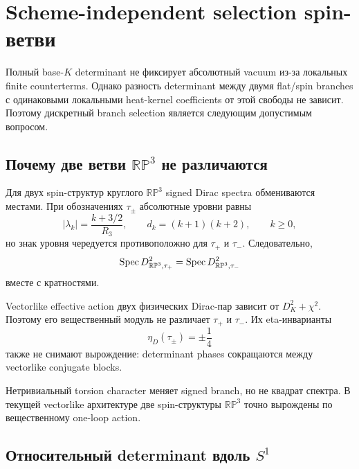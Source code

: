 \chapter{Scheme-independent selection spin-ветви}

Полный base-\(K\) determinant не фиксирует абсолютный vacuum из-за
локальных finite counterterms. Однако разность determinant между двумя
flat/spin branches с одинаковыми локальными heat-kernel coefficients от
этой свободы не зависит. Поэтому дискретный branch selection является
следующим допустимым вопросом.

\section{Почему две ветви \texorpdfstring{\(\mathbb{RP}^3\)}{RP3} не различаются}

Для двух spin-структур круглого \(\mathbb{RP}^3\) signed Dirac spectra
обмениваются местами. При обозначениях \(\tau_\pm\) абсолютные уровни равны
\begin{equation}
 |\lambda_k|=\frac{k+3/2}{R_3},
 \qquad
 d_k=(k+1)(k+2),
 \qquad k\ge0,
\end{equation}
но знак уровня чередуется противоположно для \(\tau_+\) и \(\tau_-\).
Следовательно,
\begin{equation}
 \operatorname{Spec} D_{\mathbb{RP}^3,\tau_+}^2
 =\operatorname{Spec} D_{\mathbb{RP}^3,\tau_-}^2
\end{equation}
вместе с кратностями.

Vectorlike effective action двух физических Dirac-пар зависит от
\(D_K^2+\chi^2\). Поэтому его вещественный модуль не различает
\(\tau_+\) и \(\tau_-\). Их eta-инварианты
\begin{equation}
 \eta_D(\tau_\pm)=\pm\frac14
\end{equation}
также не снимают вырождение: determinant phases сокращаются между
vectorlike conjugate blocks.

\begin{proposition}
Нетривиальный torsion character меняет signed branch, но не квадрат
спектра. В текущей vectorlike архитектуре две spin-структуры
\(\mathbb{RP}^3\) точно вырождены по вещественному one-loop action.
\end{proposition}

\section{Относительный determinant вдоль \texorpdfstring{\(S^1\)}{S1}}

